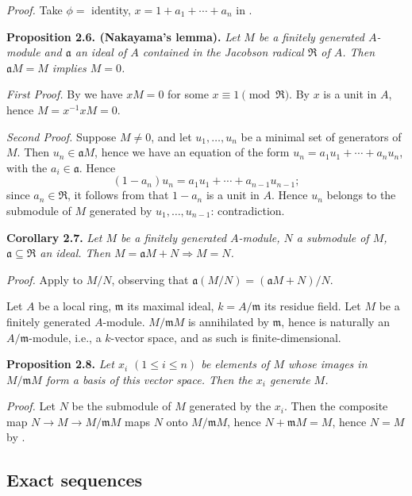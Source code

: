 \noindent\emph{Proof.} Take \(\phi={}\) identity, \(x=1+a_1+\cdots+a_n\) in . \proofbox

\noindent\textbf{Proposition 2.6. (Nakayama's lemma).} \emph{Let \(M\) be a finitely generated \(A\)-module and \(\mathfrak a\) an ideal of \(A\) contained in the Jacobson radical \(\mathfrak R\) of \(A\). Then \(\mathfrak aM=M\) implies \(M=0\).}

\noindent\emph{First Proof.} By  we have \(xM=0\) for some \(x\equiv1\pmod{\mathfrak R}\). By  \(x\) is a unit in \(A\), hence \(M=x^{-1}xM=0\). \proofbox

\noindent\emph{Second Proof.} Suppose \(M\neq0\), and let \(u_1,\ldots,u_n\) be a minimal set of generators of \(M\). Then \(u_n\in\mathfrak aM\), hence we have an equation of the form \(u_n=a_1u_1+\cdots+a_nu_n\), with the \(a_i\in\mathfrak a\). Hence
\[
(1-a_n)u_n=a_1u_1+\cdots+a_{n-1}u_{n-1};
\]
since \(a_n\in\mathfrak R\), it follows from  that \(1-a_n\) is a unit in \(A\). Hence \(u_n\) belongs to the submodule of \(M\) generated by \(u_1,\ldots,u_{n-1}\): contradiction. \proofbox

\noindent\textbf{Corollary 2.7.} \emph{Let \(M\) be a finitely generated \(A\)-module, \(N\) a submodule of \(M\), \(\mathfrak a\subseteq\mathfrak R\) an ideal. Then \(M=\mathfrak aM+N\Rightarrow M=N\).}

\noindent\emph{Proof.} Apply  to \(M/N\), observing that \(\mathfrak a(M/N)=(\mathfrak aM+N)/N\). \proofbox

Let \(A\) be a local ring, \(\mathfrak m\) its maximal ideal, \(k=A/\mathfrak m\) its residue field. Let \(M\) be a finitely generated \(A\)-module. \(M/\mathfrak mM\) is annihilated by \(\mathfrak m\), hence is naturally an \(A/\mathfrak m\)-module, i.e., a \(k\)-vector space, and as such is finite-dimensional.

\noindent\textbf{Proposition 2.8.} \emph{Let \(x_i\) \((1\leq i\leq n)\) be elements of \(M\) whose images in \(M/\mathfrak mM\) form a basis of this vector space. Then the \(x_i\) generate \(M\).}

\noindent\emph{Proof.} Let \(N\) be the submodule of \(M\) generated by the \(x_i\). Then the composite map \(N\to M\to M/\mathfrak mM\) maps \(N\) onto \(M/\mathfrak mM\), hence \(N+\mathfrak mM=M\), hence \(N=M\) by . \proofbox

\subsection{Exact sequences}

